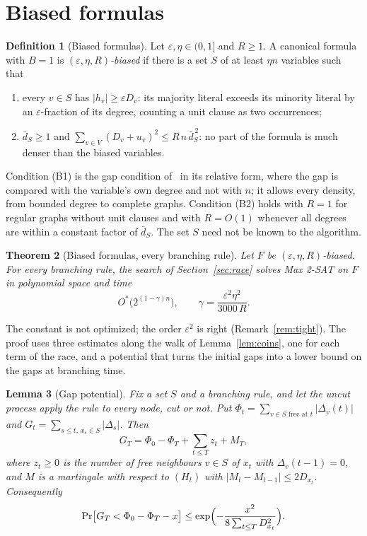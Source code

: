 \documentclass[11pt,a4paper]{article}
\newtheorem{theorem}{Theorem}
\newtheorem{lemma}[theorem]{Lemma}
\theoremstyle{definition}
\newtheorem{definition}[theorem]{Definition}
\theoremstyle{remark}
\newcommand{\Ostar}{O^{*}}
\newcommand{\dS}{\bar d_S}
\begin{document}
\section{Biased formulas}\label{sec:biased}

\begin{definition}[Biased formulas]\label{def:biased}
Let $\varepsilon,\eta\in(0,1]$ and $R\ge1$. A canonical formula with $B=1$ is
\emph{$(\varepsilon,\eta,R)$-biased} if there is a set $S$ of at least
$\eta n$ variables such that
\begin{enumerate}
 \item[(B1)] every $v\in S$ has $|h_v|\ge\varepsilon D_v$: its majority
 literal exceeds its minority literal by an $\varepsilon$-fraction of its
 degree, counting a unit clause as two occurrences;
 \item[(B2)] $\dS\ge1$ and $\sum_{v\in V}(D_v+u_v)^2\le R\,n\,\dS^{\,2}$: no
 part of the formula is much denser than the biased variables.
\end{enumerate}
\end{definition}

Condition (B1) is the gap condition of~\cite{N4} in its relative form, where
the gap is compared with the variable's own degree and not with $n$; it allows
every density, from bounded degree to complete graphs. Condition (B2) holds
with $R=1$ for regular graphs without unit clauses and with $R=O(1)$ whenever
all degrees are within a constant factor of $\dS$. The set $S$ need not be
known to the algorithm.

\begin{theorem}[Biased formulas, every branching rule]\label{thm:biased}
Let $F$ be $(\varepsilon,\eta,R)$-biased. For every branching rule, the search
of Section~\ref{sec:race} solves Max 2-SAT on $F$ in polynomial space and time
\[
 \Ostar\bigl(2^{(1-\gamma)n}\bigr),\qquad
 \gamma=\frac{\varepsilon^2\eta^2}{3000\,R}.
\]
\end{theorem}

The constant is not optimized; the order $\varepsilon^2$ is right
(Remark~\ref{rem:tight}). The proof uses three estimates along the walk of
Lemma~\ref{lem:coins}, one for each term of the race, and a potential that
turns the initial gaps into a lower bound on the gaps at branching time.

\begin{lemma}[Gap potential]\label{lem:potential}
Fix a set $S$ and a branching rule, and let the uncut process apply the rule
to every node, cut or not. Put $\Phi_t=\sum_{v\in S\text{ free at }t}|\Delta_v(t)|$
and $G_t=\sum_{s\le t,\,x_s\in S}|\Delta_s|$. Then
\[
 G_T=\Phi_0-\Phi_T+\sum_{t\le T}z_t+M_T ,
\]
where $z_t\ge0$ is the number of free neighbours $v\in S$ of $x_t$ with
$\Delta_v(t-1)=0$, and $M$ is a martingale with respect to $(H_t)$ with
$|M_t-M_{t-1}|\le2D_{x_t}$. Consequently
\[
 \Pr\bigl[G_T<\Phi_0-\Phi_T-x\bigr]\le
 \exp\Bigl(-\frac{x^2}{8\sum_{t\le T}D_{x_t}^2}\Bigr).
\]
\end{lemma}
\end{document}
